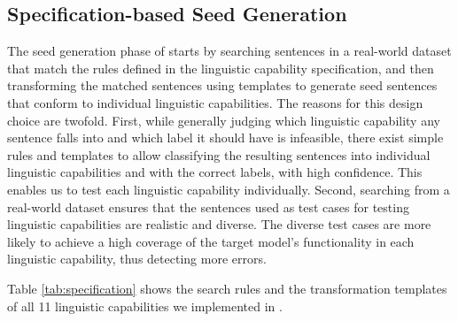 \subsection{Specification-based Seed Generation}
The seed generation phase of \tool starts by searching sentences in a
real-world dataset that match the rules defined in the linguistic
capability specification, and then transforming the matched sentences
using templates to generate seed sentences that conform to individual
linguistic capabilities. The reasons for this design choice are
twofold.  First, while generally judging which linguistic capability
any sentence falls into and which label it should have is infeasible,
there exist simple rules and templates to allow classifying the
resulting sentences into individual linguistic capabilities and with
the correct labels, with high confidence.  This enables us to test
each linguistic capability individually.  Second, searching from a
real-world dataset ensures that the sentences used as test cases for
testing linguistic capabilities are realistic and diverse. The diverse
test cases are more likely to achieve a high coverage of the target
model's functionality in each linguistic capability, thus detecting
more errors.


Table \ref{tab:specification} shows the search rules and the
transformation templates of all 11 linguistic capabilities we
implemented in \tool{}. 

